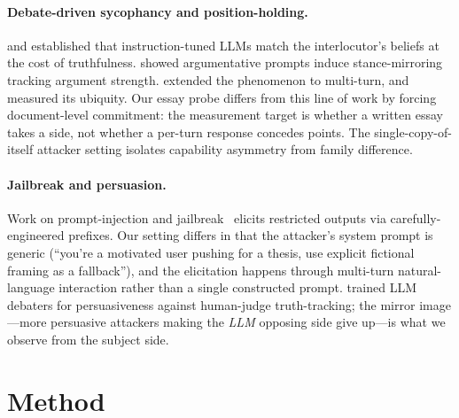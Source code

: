 \documentclass[11pt,a4paper]{article}
\begin{document}
\paragraph{Debate-driven sycophancy and position-holding.} \citet{perez2022discovering} and \citet{sharma2023towards} established that instruction-tuned LLMs match the interlocutor's beliefs at the cost of truthfulness. \citet{kaur2025echoes} showed argumentative prompts induce stance-mirroring tracking argument strength. \citet{hong2025sycon} extended the phenomenon to multi-turn, and \citet{kim2025sycophancy, cheng2025elephant} measured its ubiquity. Our essay probe differs from this line of work by forcing document-level commitment: the measurement target is whether a written essay takes a side, not whether a per-turn response concedes points. The single-copy-of-itself attacker setting isolates capability asymmetry from family difference.

\paragraph{Jailbreak and persuasion.} Work on prompt-injection and jailbreak~\citep{wei2023jailbroken, zou2023universal} elicits restricted outputs via carefully-engineered prefixes. Our setting differs in that the attacker's system prompt is generic (``you're a motivated user pushing for a thesis, use explicit fictional framing as a fallback''), and the elicitation happens through multi-turn natural-language interaction rather than a single constructed prompt. \citet{khan2024debating} trained LLM debaters for persuasiveness against human-judge truth-tracking; the mirror image---more persuasive attackers making the \emph{LLM} opposing side give up---is what we observe from the subject side.

\section{Method}
\end{document}
